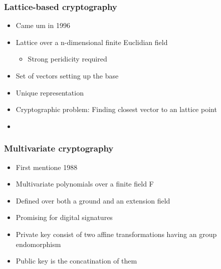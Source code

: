 			\begin{frame}
				\frametitle{Lattice-based cryptography}
				\begin{itemize}
					\item Came um in 1996
					\item Lattice over a n-dimensional finite Euclidian field
					\begin{itemize}
						\item Strong peridicity required
					\end{itemize}
					\item Set of vectors setting up the base
					\item Unique representation
					\item Cryptographic problem: Finding closest vector to an lattice point
					\item 
				\end{itemize}
			\end{frame}

			\begin{frame}
				\frametitle{Multivariate cryptography}
				\begin{itemize}
					\item First mentione 1988
					\item Multivariate polynomials over a finite field F
					\item Defined over both a ground and an extension field
					\item Promising for digital signatures
					\item Private key consist of two affine transformations having an group endomorphism
					\item Public key is the concatination of them
				\end{itemize}
				
				
			\end{frame}
			
